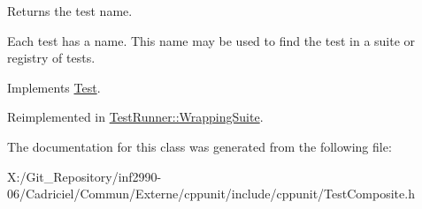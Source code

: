Returns the test name. 

Each test has a name. This name may be used to find the test in a suite or registry of tests. 

Implements \hyperlink{class_test_a5e024da199f811a33264e432c21dcc94}{Test}.



Reimplemented in \hyperlink{class_test_runner_1_1_wrapping_suite_a500c7e2413a4830b87d8ab061251f856}{Test\-Runner\-::\-Wrapping\-Suite}.



The documentation for this class was generated from the following file\-:\begin{DoxyCompactItemize}
\item 
X\-:/\-Git\-\_\-\-Repository/inf2990-\/06/\-Cadriciel/\-Commun/\-Externe/cppunit/include/cppunit/Test\-Composite.\-h\end{DoxyCompactItemize}
